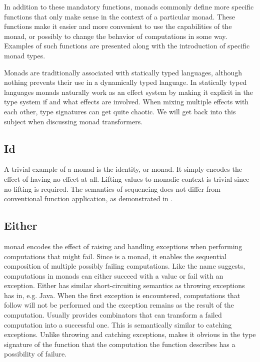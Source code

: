In addition to these mandatory functions, monads commonly define more specific functions that only make sense in the context of a particular monad. These functions make it easier and more convenient to use the capabilities of the monad, or possibly to change the behavior of computations in some way. Examples of such functions are presented along with the introduction of specific monad types.

Monads are traditionally associated with statically typed languages, although nothing prevents their use in a dynamically typed language. In statically typed languages monads naturally work as an effect system by making it explicit in the type system if and what effects are involved. When mixing multiple effects with each other, type signatures can get quite chaotic. We will get back into this subject when discussing monad transformers.


\subsection{Id}
A trivial example of a monad is the identity, or  monad. It simply encodes the effect of having no effect at all.   Lifting values to monadic context is trivial since no lifting is required. The semantics of sequencing does not differ from conventional function application, as demonstrated in .




\subsection{Either} \label{monads:either}
 monad encodes the effect of raising and handling exceptions when performing computations that might fail. Since  is a monad, it enables the sequential composition of multiple possibly failing computations. Like the name suggests, computations in  monads can either succeed with a value or fail with an exception. Either has similar short-circuiting semantics as throwing exceptions has in, e.g. Java. When the first exception is encountered, computations that follow will not be performed and the exception remains as the result of the computation. Usually  provides combinators that can transform a failed computation into a successful one. This is semantically similar to catching exceptions. Unlike throwing and catching exceptions,  makes it obvious in the type signature of the function that the computation the function describes has a possibility of failure.

